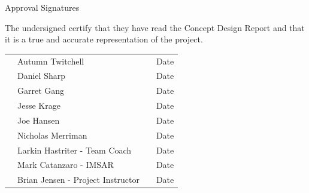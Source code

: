 \documentclass[letterpaper, 11pt, twoside, article]{memoir}
\begin{document}
\begin {centering}
{\LARGE Approval Signatures}

\vspace{.5in}

The undersigned certify that they have read the Concept Design Report and that it is a true and accurate representation of the project.

\end{centering}
\vspace{.5 in}			
\begin{tabularx}{\textwidth}{C{.25 in} L{2.5 in} C{.5 in} R{1.5 in}}
 

& Autumn Twitchell & & Date \vspace{.25 in}\\
 
& Daniel Sharp & & Date \vspace {.25 in}\\
 
& Garret Gang & & Date \vspace{.25 in}\\
 
& Jesse Krage & & Date \vspace{.25 in}\\
 
& Joe Hansen & & Date \vspace{.25 in}\\
 
& Nicholas Merriman & & Date \vspace{.25 in}\\
 
&  Larkin Hastriter - Team Coach & & Date \vspace{.25 in}\\
 
& Mark Catanzaro - IMSAR & & Date \vspace{.25 in}\\
 
& Brian Jensen - Project Instructor & & Date \vspace{0 in}\\

\end{tabularx}

\vspace{1 in}

\cleardoublepage

\tableofcontents*


\mainmatter

%
\end{document}

